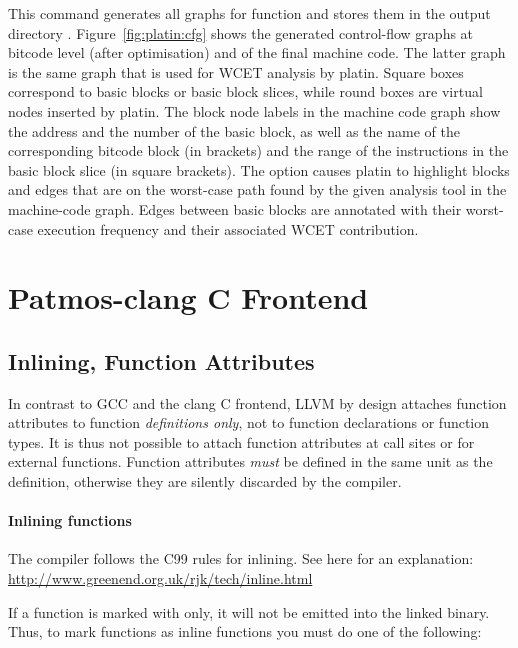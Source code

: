 
This command generates all graphs for function  and stores them in the output directory .
Figure~\ref{fig:platin:cfg} shows the generated control-flow graphs at bitcode level (after optimisation) and of the final
machine code. The latter graph is the same graph that is used for WCET analysis by platin.
Square boxes correspond to basic blocks or basic block slices, while round boxes are virtual nodes inserted by platin.
The block node labels in the machine code graph show the address and the number of the basic block, as well as the name of
the corresponding bitcode block (in brackets) and the range of the instructions in the basic block slice (in square
brackets).
%
The  option causes platin to highlight blocks and edges that are on the worst-case path found by
the given analysis tool in the machine-code graph. Edges between basic blocks are annotated with their worst-case execution frequency
and their associated WCET contribution.



\section{Patmos-clang C Frontend}
\label{sec:toolchain:frontend}

\subsection{Inlining, Function Attributes}

In contrast to GCC and the clang C frontend, LLVM by design attaches function attributes to
function \emph{definitions only}, not to function declarations or function types.
It is thus not possible to attach function attributes at call sites or for external functions.
Function attributes \emph{must} be defined in the same unit as the definition, otherwise they
are silently discarded by the compiler.

\paragraph{Inlining functions}
The compiler follows the C99 rules for inlining. See here for an explanation:
%
\url{http://www.greenend.org.uk/rjk/tech/inline.html}

If a function is marked with  only, it will not be emitted into the linked binary.
Thus, to mark functions as inline functions you must do one of the following:

